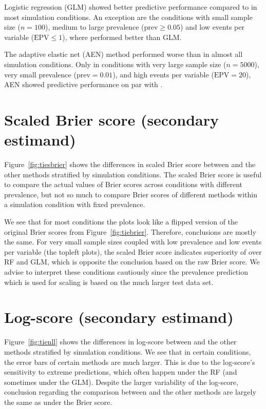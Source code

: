 \documentclass[a4paper, 11pt]{article}
\begin{document}
Logistic regression (GLM) showed better predictive performance compared to
\ainet{} in most simulation conditions. An exception are the conditions with
small sample size ($n = 100$), medium to large prevalence
($\mbox{prev} \geq 0.05$) and low events per variable ($\mbox{EPV} \leq 1$),
where \ainet{} performed better than GLM.

The adaptive elastic net (AEN) method performed worse than \ainet{} in almost
all simulation conditions. Only in conditions with very large sample size
($n = 5000$), very small prevalence ($\mbox{prev} = 0.01$), and high events per
variable ($\mbox{EPV} = 20$), AEN showed predictive performance on par with
\ainet{}.

\section{Scaled Brier score (secondary estimand)}
Figure~\ref{fig:tiesbrier} shows the differences in scaled Brier score between
\ainet{} and the other methods stratified by simulation conditions. The scaled
Brier score is useful to compare the actual values of Brier scores across
conditions with different prevalence, but not so much to compare Brier scores of
different methods within a simulation condition with fixed prevalence.

We see that for most conditions the plots look like a flipped version of the
original Brier scores from Figure~\ref{fig:tiebrier}. Therefore, conclusions are
mostly the same. For very small sample sizes coupled with low prevalence and low
events per variable (the topleft plots), the scaled Brier score indicates
superiority of \ainet{} over RF and GLM, which is opposite the conclusion based
on the raw Brier score. We advise to interpret these conditions cautiously since
the prevalence prediction which is used for scaling is based on the much larger
test data set.

\section{Log-score (secondary estimand)}
Figure~\ref{fig:tienll} shows the differences in log-score between \ainet{} and
the other methods stratified by simulation conditions. We see that in certain
conditions, the error bars of certain methods are much larger. This is due to
the log-score's sensitivity to extreme predictions, which often happen under the
RF (and sometimes under the GLM). Despite the larger variability of the log-score,
conclusion regarding the comparison between \ainet{} and the other
methods are largely the same as under the Brier score.
\end{document}
